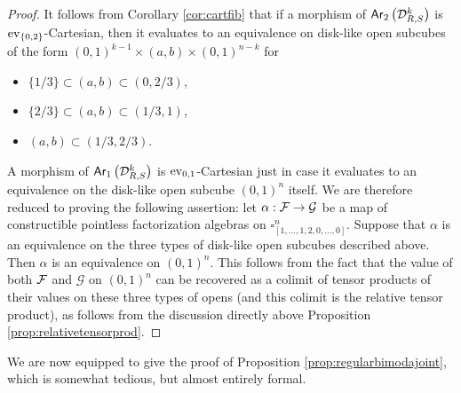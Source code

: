 \documentclass[10pt, reqno, twoside
, final
]{amsart}
\numberwithin{equation}{subsection}%
\theoremstyle{definition}
\theoremstyle{definition}
\theoremstyle{definition}
\theoremstyle{definition}
\theoremstyle{definition}
\theoremstyle{definition}
\theoremstyle{definition}
\theoremstyle{definition}
\theoremstyle{definition}
\theoremstyle{plain}
\theoremstyle{definition}
\theoremstyle{plain}
\theoremstyle{definition}
\theoremstyle{plain}
\theoremstyle{definition}
\theoremstyle{definition}
\theoremstyle{plain}
\theoremstyle{plain}
\theoremstyle{definition}
\theoremstyle{plain}
\theoremstyle{plain}
\theoremstyle{plain}
\begin{document}
\begin{proof}
It follows from Corollary \ref{cor:cartfib} that if a morphism of $\mathsf{Ar}_2\left(\mathcal{D}_{R,S}^k\right)$ is $\mathrm{ev}_{\{0,2\}}$-Cartesian, then it evaluates to an equivalence on disk-like open subcubes of the form $(0,1)^{k-1}\times (a,b)\times (0,1)^{n-k}$ for
\begin{itemize}
    \item $\{1/3\}\subset (a,b)\subset (0,2/3)$,
    \item $\{2/3\}\subset (a,b)\subset (1/3,1)$,
    \item $(a,b)\subset (1/3,2/3)$.
\end{itemize}
A morphism of $\mathsf{Ar}_1\left(\mathcal{D}_{R,S}^k\right)$ is $\mathrm{ev}_{0,1}$-Cartesian just in case it evaluates to an equivalence on the disk-like open subcube $(0,1)^n$ itself. We are therefore reduced to proving the following assertion: let $\alpha:\mathcal{F}\rightarrow \mathcal{G}$ be a map of constructible pointless factorization algebras on $\square^n_{[1,\ldots,1,2,0,\ldots,0]}$. Suppose that $\alpha$ is an equivalence on the three types of disk-like open subcubes described above. Then $\alpha$ is an equivalence on $(0,1)^n$. This follows from the fact that the value of both $\mathcal{F}$ and $\mathcal{G}$ on $(0,1)^n$ can be recovered as a colimit of tensor products of their values on these three types of opens (and this colimit is the relative tensor product), as follows from the discussion directly above Proposition \ref{prop:relativetensorprod}. 
\end{proof}

We are now equipped to give the proof of Proposition \ref{prop:regularbimodajoint}, which is somewhat tedious, but almost entirely formal. 
\end{document}

